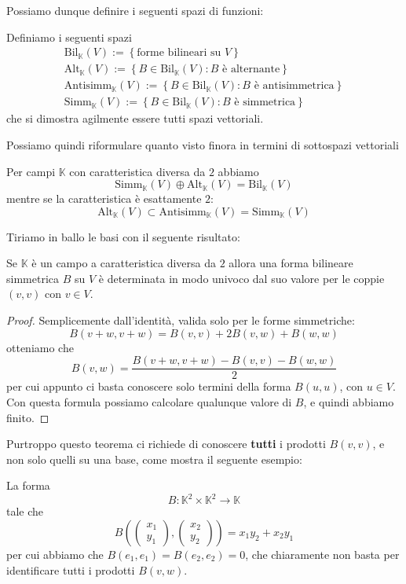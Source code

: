 \documentclass[11pt]{scrartcl}
\newcommand{\KK}{\mathbb{K}}
\begin{document}
	Possiamo dunque definire i seguenti spazi di funzioni:
	\begin{definition}
		Definiamo i seguenti spazi
		\begin{gather*}
			\text{Bil}_\KK(V):=\left\{\text{forme bilineari su $V$}\right\} \\
			\text{Alt}_\KK(V):=\left\{B\in \text{Bil}_\KK(V):\text{$B$ è alternante}\right\} \\
			\text{Antisimm}_\KK(V):=\left\{B\in \text{Bil}_\KK(V):\text{$B$ è antisimmetrica}\right\} \\
			\text{Simm}_\KK(V):=\left\{B\in \text{Bil}_\KK(V):\text{$B$ è simmetrica}\right\}
		\end{gather*}
		che si dimostra agilmente essere tutti spazi vettoriali.
	\end{definition}
	Possiamo quindi riformulare quanto visto finora in termini di sottospazi vettoriali
	\begin{corollary}[di Decomposizione]
		Per campi $\KK$ con caratteristica diversa da $2$ abbiamo
		$$\text{Simm}_\KK(V)\oplus \text{Alt}_\KK(V)=\text{Bil}_\KK(V)$$
		mentre se la caratteristica è esattamente $2$:
		$$\text{Alt}_\KK(V)\subset \text{Antisimm}_\KK(V)=\text{Simm}_\KK(V)$$
	\end{corollary}
	Tiriamo in ballo le basi con il seguente risultato:
	\begin{theorem}
		Se $\KK$ è un campo a caratteristica diversa da $2$ allora una forma bilineare simmetrica $B$ su $V$ è determinata in modo univoco dal suo valore per le coppie $(v,v)$ con $v\in V$.
	\end{theorem}
	\begin{proof}
		Semplicemente dall'identità, valida solo per le forme simmetriche:
		$$B(v+w,v+w)=B(v,v)+2B(v,w)+B(w,w)$$
		otteniamo che
		$$B(v,w)=\frac{B(v+w,v+w)-B(v,v)-B(w,w)}{2}$$
		per cui appunto ci basta conoscere solo termini della forma $B(u,u)$, con $u\in V$. Con questa formula possiamo calcolare qualunque valore di $B$, e quindi abbiamo finito.
	\end{proof}
	Purtroppo questo teorema ci richiede di conoscere \textbf{tutti} i prodotti $B(v,v)$, e non solo quelli su una base, come mostra il seguente esempio:
	\begin{example}
		La forma
		$$B:\KK^2\times \KK^2\to \KK$$
		tale che
		$$B\left(
		\begin{pmatrix}
			x_1 \\
			y_1
		\end{pmatrix},
		\begin{pmatrix}
			x_2 \\
			y_2
		\end{pmatrix}
		\right)=x_1y_2+x_2y_1$$
		per cui abbiamo che $B(e_1,e_1)=B(e_2,e_2)=0$, che chiaramente non basta per identificare tutti i prodotti $B(v,w)$.
	\end{example}
\end{document}
